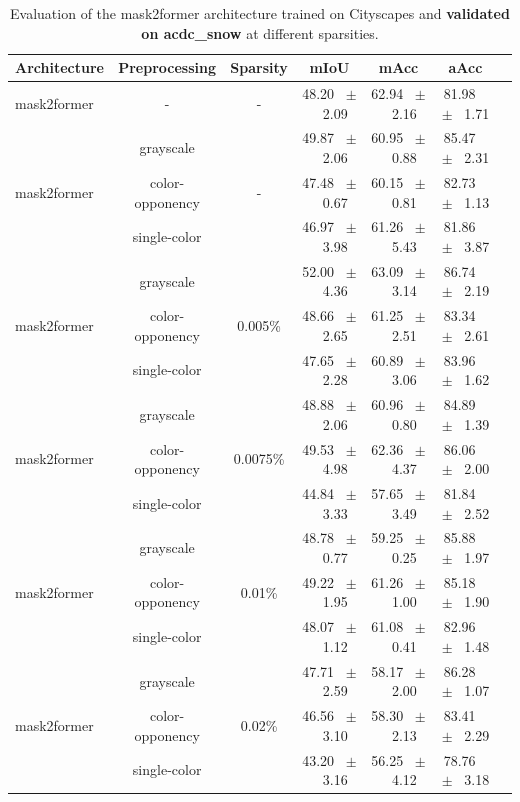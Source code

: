 \begin{table}[h]
  \centering
  \caption{Evaluation of the mask2former architecture trained on Cityscapes and \textbf{validated on acdc_snow} at different sparsities.}
  \begin{tabular}{@{}lccc ccc@{}}
    \toprule
    Architecture & Preprocessing & Sparsity & mIoU & mAcc & aAcc \\
    \midrule
    mask2former & - & - & 48.20 ~$\pm$~ 2.09 & 62.94 ~$\pm$~ 2.16 & 81.98 ~$\pm$~ 1.71 \\
    \midrule
    \midrule
    \multirow{3}{*}{mask2former} & grayscale & \multirow{3}{*}{-} & 49.87 ~$\pm$~ 2.06 & 60.95 ~$\pm$~ 0.88 & 85.47 ~$\pm$~ 2.31 \\
    & color-opponency & & 47.48 ~$\pm$~ 0.67 & 60.15 ~$\pm$~ 0.81 & 82.73 ~$\pm$~ 1.13 \\
    & single-color & & 46.97 ~$\pm$~ 3.98 & 61.26 ~$\pm$~ 5.43 & 81.86 ~$\pm$~ 3.87 \\
    \midrule
    \multirow{3}{*}{mask2former} & grayscale & \multirow{3}{*}{0.005\%} & 52.00 ~$\pm$~ 4.36 & 63.09 ~$\pm$~ 3.14 & 86.74 ~$\pm$~ 2.19 \\
    & color-opponency & & 48.66 ~$\pm$~ 2.65 & 61.25 ~$\pm$~ 2.51 & 83.34 ~$\pm$~ 2.61 \\
    & single-color & & 47.65 ~$\pm$~ 2.28 & 60.89 ~$\pm$~ 3.06 & 83.96 ~$\pm$~ 1.62 \\
    \midrule
    \multirow{3}{*}{mask2former} & grayscale & \multirow{3}{*}{0.0075\%} & 48.88 ~$\pm$~ 2.06 & 60.96 ~$\pm$~ 0.80 & 84.89 ~$\pm$~ 1.39 \\
    & color-opponency & & 49.53 ~$\pm$~ 4.98 & 62.36 ~$\pm$~ 4.37 & 86.06 ~$\pm$~ 2.00 \\
    & single-color & & 44.84 ~$\pm$~ 3.33 & 57.65 ~$\pm$~ 3.49 & 81.84 ~$\pm$~ 2.52 \\
    \midrule
    \multirow{3}{*}{mask2former} & grayscale & \multirow{3}{*}{0.01\%} & 48.78 ~$\pm$~ 0.77 & 59.25 ~$\pm$~ 0.25 & 85.88 ~$\pm$~ 1.97 \\
    & color-opponency & & 49.22 ~$\pm$~ 1.95 & 61.26 ~$\pm$~ 1.00 & 85.18 ~$\pm$~ 1.90 \\
    & single-color & & 48.07 ~$\pm$~ 1.12 & 61.08 ~$\pm$~ 0.41 & 82.96 ~$\pm$~ 1.48 \\
    \midrule
    \multirow{3}{*}{mask2former} & grayscale & \multirow{3}{*}{0.02\%} & 47.71 ~$\pm$~ 2.59 & 58.17 ~$\pm$~ 2.00 & 86.28 ~$\pm$~ 1.07 \\
    & color-opponency & & 46.56 ~$\pm$~ 3.10 & 58.30 ~$\pm$~ 2.13 & 83.41 ~$\pm$~ 2.29 \\
    & single-color & & 43.20 ~$\pm$~ 3.16 & 56.25 ~$\pm$~ 4.12 & 78.76 ~$\pm$~ 3.18 \\
    \midrule
    \bottomrule
  \end{tabular}
  \label{tab:sparse_mask2former_acdc_snow}
\end{table}